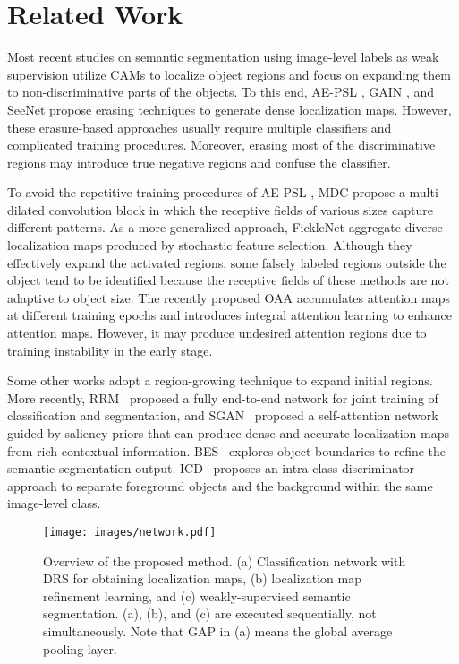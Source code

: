\documentclass[letterpaper]{article} \usepackage{aaai21}  \usepackage{times}  \usepackage{helvet} \usepackage{courier}  \usepackage[hyphens]{url}  \usepackage{graphicx} \urlstyle{rm} \def\UrlFont{\rm}  \usepackage{natbib}  \usepackage{caption} \frenchspacing  \setlength{\pdfpagewidth}{8.5in}  \setlength{\pdfpageheight}{11in}
\begin{document}
\section{Related Work}

Most recent studies on semantic segmentation using image-level labels as weak supervision utilize CAMs \cite{zhou2016learning} to localize object regions and focus on expanding them to non-discriminative parts of the objects.
To this end, AE-PSL \cite{wei2017object}, GAIN \cite{li2018tell}, and SeeNet \cite{hou2018self} propose erasing techniques to generate dense localization maps. However, these erasure-based approaches usually require multiple classifiers and complicated training procedures. 
Moreover, erasing most of the discriminative regions may introduce true negative regions and confuse the classifier.

To avoid the repetitive training procedures of AE-PSL \cite{wei2017object}, MDC \cite{wei2018revisiting} propose a multi-dilated convolution block in which the receptive fields of various sizes capture different patterns.
As a more generalized approach, FickleNet \cite{lee2019ficklenet} aggregate diverse localization maps produced by stochastic feature selection. 
Although they effectively expand the activated regions, some falsely labeled regions outside the object tend to be identified because the receptive fields of these methods are not adaptive to object size.
The recently proposed OAA \cite{jiang2019integral} accumulates attention maps at different training epochs and introduces integral attention learning to enhance attention maps.
However, it may produce undesired attention regions due to training instability in the early stage. 

Some other works \cite{ahn2018learning, huang2018weakly, shimoda2019self} adopt a region-growing technique to expand initial regions. 
More recently, RRM~\cite{zhang2020reliability} proposed a fully end-to-end network for joint training of classification and segmentation, and SGAN~\cite{yao2020saliency} proposed a self-attention network guided by saliency priors that can produce dense and accurate localization maps from rich contextual information.
BES~\cite{chen2020weakly} explores object boundaries to refine the semantic segmentation output.
ICD~\cite{fan2020learning} proposes an intra-class discriminator approach to separate foreground objects and the background within the same image-level class.


\begin{figure*}[t]
    \centering
    \texttt{[image: images/network.pdf]}
    \caption{
        Overview of the proposed method. (a) Classification network with DRS for obtaining localization maps, (b) localization map refinement learning, and (c) weakly-supervised semantic segmentation.
        (a), (b), and (c) are executed sequentially, not simultaneously. Note that GAP in (a) means the global average pooling layer.
    }
    \label{figure:network}
\end{figure*}
\end{document}

